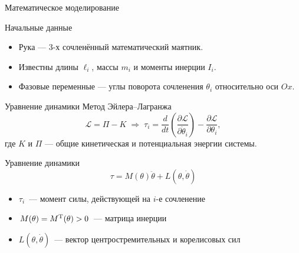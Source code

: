     \begin{frame}{Математическое моделирование}
        \begin{block}{Начальные данные}
            \begin{itemize}
                \item Рука --- 3-х сочленённый математический маятник.
                \item Известны длины $\ell_i$, массы $m_i$ и моменты инерции $I_i$.
                \item Фазовые переменные --- углы поворота сочленения $\theta_i$ относительно оси $Ox$. 
            \end{itemize}
        \end{block}
    \end{frame}

    \begin{frame}{Уравнение динамики}
        Метод Эйлера--Лагранжа
        $$
            \mathcal{L} = \Pi - K
            \;\Longrightarrow\;
            \tau_i
            =
              \frac{d}{dt}\left(\frac{\partial \mathcal{L}}{\partial \dot \theta_i}\right)
            - \frac{\partial \mathcal{L}}{\partial \theta_i},
        $$
        где $K$ и $\Pi$ --- общие кинетическая и потенциальная энергии системы.
        \vfill
        \begin{block}{Уравнение динамики}
            $$
                \tau = M(\theta)\ddot\theta + L(\theta, \dot\theta)
            $$
            \begin{itemize}
                \item $\tau_i$~--- момент силы, действующей на $i$-е сочленение
                \item $M(\theta)=M^{\textnormal{T}}(\theta)>0$~--- матрица инерции
                \item $L(\theta, \dot\theta)$~--- вектор центростремительных и корелисовых сил
            \end{itemize}
        \end{block}
    \end{frame}

